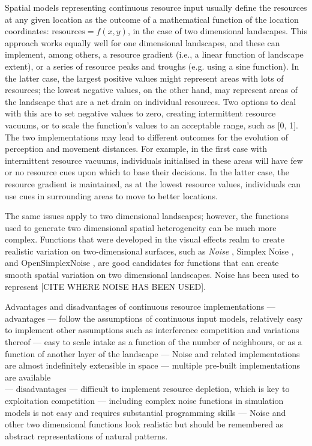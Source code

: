 Spatial models representing continuous resource input usually define the resources at any given location as the outcome of a mathematical function of the location coordinates: $\text{resources} = f(x,y)$, in the case of two dimensional landscapes.
This approach works equally well for one dimensional landscapes, and these can implement, among others, a resource gradient (i.e., a linear function of landscape extent), or a series of resource peaks and troughs (e.g. using a sine function).
In the latter case, the largest positive values might represent areas with lots of resources; the lowest negative values, on the other hand, may represent areas of the landscape that are a net drain on individual resources.
Two options to deal with this are to set negative values to zero, creating intermittent resource vacuums, or to scale the function's values to an acceptable range, such as [0, 1].
The two implementations may lead to different outcomes for the evolution of perception and movement distances.
For example, in the first case with intermittent resource vacuums, individuals initialised in these areas will have few or no resource cues upon which to base their decisions.
In the latter case, the resource gradient is maintained, as at the lowest resource values, individuals can use cues in surrounding areas to move to better locations.

The same issues apply to two dimensional landscapes; however, the functions used to generate two dimensional spatial heterogeneity can be much more complex.
Functions that were developed in the visual effects realm to create realistic variation on two-dimensional surfaces, such as \textit{Noise} \citep{perlin}, Simplex Noise \citep{simplexnoise}, and OpenSimplexNoise \citep{opensimplexnoise}, are good candidates for functions that can create smooth spatial variation on two dimensional landscapes.
Noise has been used to represent [CITE WHERE NOISE HAS BEEN USED].

Advantages and disadvantages of continuous resource implementations --- advantages --- follow the assumptions of continuous input models, relatively easy to implement other assumptions such as interference competition and variations thereof \citep{tregenza1995,vandermeer1997} --- easy to scale intake as a function of the number of neighbours, or as a function of another layer of the landscape --- Noise and related implementations are almost indefinitely extensible in space --- multiple pre-built implementations are available\\
--- disadvantages --- difficult to implement resource depletion, which is key to exploitation competition --- including complex noise functions in simulation models is not easy and requires substantial programming skills --- Noise and other two dimensional functions look realistic but should be remembered as abstract representations of natural patterns.

